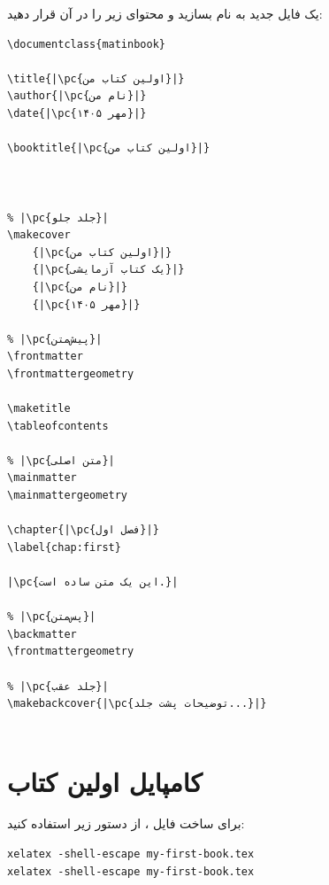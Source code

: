 یک فایل جدید به نام  بسازید
و محتوای زیر را در آن قرار دهید:

\begin{latin}
\begin{verbatim}
\documentclass{matinbook}

\title{|\pc{اولین کتاب من}|}
\author{|\pc{نام من}|}
\date{|\pc{مهر ۱۴۰۵}|}

\booktitle{|\pc{اولین کتاب من}|}



% |\pc{جلد جلو}|
\makecover
    {|\pc{اولین کتاب من}|}
    {|\pc{یک کتاب آزمایشی}|}
    {|\pc{نام من}|}
    {|\pc{مهر ۱۴۰۵}|}

% |\pc{پیش‌متن}|
\frontmatter
\frontmattergeometry

\maketitle
\tableofcontents

% |\pc{متن اصلی}|
\mainmatter
\mainmattergeometry

\chapter{|\pc{فصل اول}|}
\label{chap:first}

|\pc{این یک متن ساده است.}|

% |\pc{پس‌متن}|
\backmatter
\frontmattergeometry

% |\pc{جلد عقب}|
\makebackcover{|\pc{توضیحات پشت جلد...}|}


\end{verbatim}
\end{latin}


\section{کامپایل اولین کتاب}
\label{sec:first-book-compile}

برای ساخت فایل ، از دستور زیر استفاده
کنید:

\begin{latin}
\begin{verbatim}
xelatex -shell-escape my-first-book.tex
xelatex -shell-escape my-first-book.tex
\end{verbatim}
\end{latin}

